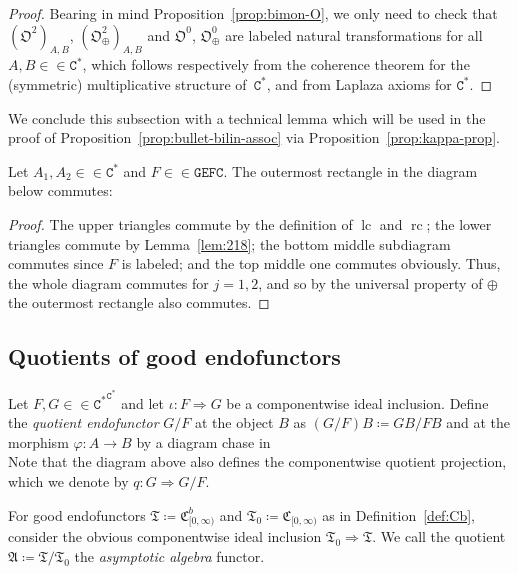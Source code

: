 \documentclass[10pt]{simplearticle}
\newcommand{\tikzinput}[1]{}
\newcommand{\GEFC}{\mathbb{\mathtt{GEFC}}}
\newcommand{\Cstar}{\mathtt{C^{*}}}
\newcommand{\EFC}{\Cstar^{\Cstar}}
\newcommand{\rc}{\operatorname{rc}}
\newcommand{\lc}{\operatorname{lc}}
\begin{document}
\begin{proof}
Bearing in mind Proposition~\ref{prop:bimon-O}, we only need to
check that $(\mathfrak{O}^{2})_{A,B}$, $(\mathfrak{O}^{2}_{\oplus})_{A,B}$
and $\mathfrak{O}^{0}$, $\mathfrak{O}^{0}_{\oplus}$ are labeled
natural transformations for all $A,B\in\in\Cstar$, which follows
respectively from the coherence theorem for the (symmetric) multiplicative
structure of~$\Cstar$, and from Laplaza axioms for $\Cstar$.
\end{proof}
We conclude this subsection with a technical lemma
which will be used in the proof of Proposition~\ref{prop:bullet-bilin-assoc}
via Proposition~\ref{prop:kappa-prop}.
\begin{lem}\label{lem:d296}
Let $A_{1},A_{2}\in\in\Cstar$ and $F\in\in\GEFC$.
The outermost rectangle in the diagram below commutes:
\[
\tikzinput{d475}
\]
\end{lem}

\begin{proof}
The upper triangles commute by the definition of $\lc$ and $\rc$;
the lower triangles commute by Lemma~\ref{lem:218}; the bottom middle
subdiagram commutes since $F$ is labeled; and the top middle one
commutes obviously. Thus, the whole diagram commutes for $j=1,2$,
and so by the universal property of $\oplus$ the outermost rectangle
also commutes.
\end{proof}

\subsection{\label{subsec:quot}Quotients of good endofunctors}

\begin{defn}\label{def:quot}
Let $F,G\in\in\EFC$ and let $\iota\colon F\Rightarrow G$
be a componentwise ideal inclusion. Define the \emph{quotient endofunctor}
$G/F$ at the object $B$ as $(G/F)B\coloneqq GB/FB$ and at the morphism
$\varphi\colon A\to B$ by a diagram chase in
\begin{equation}
\tikzinput{d171}\label{eq:diagram-search-quotient-functor}
\end{equation}
Note that the diagram above also defines the componentwise quotient
projection, which we denote by $q\colon G\Rightarrow G/F$.
\end{defn}

\begin{example}\label{exa:frakA}
For
good endofunctors $\mathfrak{T}\coloneqq\mathfrak{C}^{b}_{[0,\infty)}$
and $\mathfrak{T}_{0}\coloneqq\mathfrak{C}_{[0,\infty)}$ as in Definition~\ref{def:Cb},
consider the obvious componentwise ideal inclusion $\mathfrak{T}_{0}\Rightarrow\mathfrak{T}$.
We call the quotient $\mathfrak{A}\coloneqq\mathfrak{T}/\mathfrak{T}_{0}$
the \emph{asymptotic algebra} functor.
\end{example}
\end{document}
